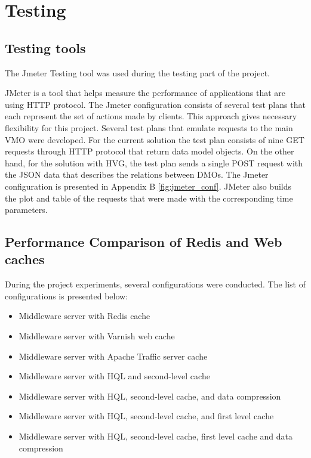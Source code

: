 \section{Testing}

\subsection{Testing tools}

The Jmeter Testing tool was used during the testing part of the project. 

JMeter is a tool that helps measure the performance of applications that are using HTTP protocol. The Jmeter configuration consists of several test plans that each represent the set of actions made by clients. This approach gives necessary flexibility for this project. Several test plans that emulate requests to the main VMO were developed. For the current solution the test plan consists of nine GET requests through HTTP protocol that return data model objects. On the other hand, for the solution with HVG, the test plan sends a single POST request with the JSON data that describes the relations between DMOs. The Jmeter configuration is presented in Appendix B \ref{fig:jmeter_conf}. JMeter also builds the plot and table of the requests that were made with the corresponding time parameters.

\subsection{Performance Comparison of Redis and Web caches}


During the project experiments, several configurations were conducted. The list of configurations is presented below:

\begin{itemize}
  \item Middleware server with Redis cache
  \item Middleware server with Varnish web cache
  \item Middleware server with Apache Traffic server cache
  \item Middleware server with HQL and second-level cache
  \item Middleware server with HQL, second-level cache, and data compression
  \item Middleware server with HQL, second-level cache, and first level cache
  \item Middleware server with HQL, second-level cache, first level cache and data compression
\end{itemize}

